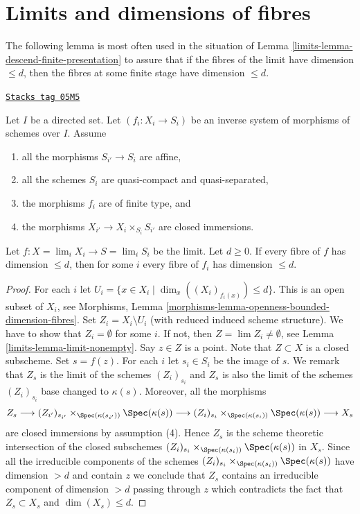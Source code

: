 \section{Limits and dimensions of fibres}
\label{limits-section-limits-dimension}
The following lemma is most often used in the situation of
Lemma \ref{limits-lemma-descend-finite-presentation}
to assure that if the fibres of the limit have dimension $\leq d$,
then the fibres at some finite stage have dimension $\leq d$.

\begin{lemma}
\label{limits-lemma-limit-dimension}
\href{https://stacks.math.columbia.edu/tag/05M5}{\texttt{Stacks tag 05M5}}

Let $I$ be a directed set.
Let $(f_i : X_i \to S_i)$ be an inverse system of morphisms of schemes
over $I$. Assume
\begin{enumerate}
\item all the morphisms $S_{i'} \to S_i$ are affine,
\item all the schemes $S_i$ are quasi-compact and quasi-separated,
\item the morphisms $f_i$ are of finite type, and
\item the morphisms $X_{i'} \to X_i \times_{S_i} S_{i'}$ are closed
immersions.
\end{enumerate}
Let $f : X = \lim_i X_i \to S = \lim_i S_i$ be the limit.
Let $d \geq 0$.
If every fibre of $f$ has dimension $\leq d$, then for some $i$
every fibre of $f_i$ has dimension $\leq d$.
\end{lemma}

\begin{proof}

For each $i$ let $U_i = \{x \in X_i \mid \dim_x((X_i)_{f_i(x)}) \leq d\}$.
This is an open subset of $X_i$, see
Morphisms, Lemma \ref{morphisms-lemma-openness-bounded-dimension-fibres}.
Set $Z_i = X_i \setminus U_i$ (with reduced induced scheme structure).
We have to show that $Z_i = \emptyset$ for some $i$.
If not, then $Z = \lim Z_i \not = \emptyset$, see
Lemma \ref{limits-lemma-limit-nonempty}.
Say $z \in Z$ is a point. Note that $Z \subset X$ is a closed subscheme.
Set $s = f(z)$. For each $i$ let $s_i \in S_i$ be the image
of $s$. We remark that $Z_s$ is the limit of the schemes $(Z_i)_{s_i}$
and $Z_s$ is also the limit of the schemes $(Z_i)_{s_i}$ base
changed to $\kappa(s)$. Moreover, all the morphisms
$$
Z_s
\longrightarrow
(Z_{i'})_{s_{i'}} \times_{\Spec(\kappa(s_{i'}))} \Spec(\kappa(s))
\longrightarrow
(Z_i)_{s_i} \times_{\Spec(\kappa(s_i))} \Spec(\kappa(s))
\longrightarrow
X_s
$$
are closed immersions by assumption (4). Hence $Z_s$ is the scheme
theoretic intersection of the closed subschemes
$(Z_i)_{s_i} \times_{\Spec(\kappa(s_i))} \Spec(\kappa(s))$
in $X_s$. Since all the irreducible components of the schemes
$(Z_i)_{s_i} \times_{\Spec(\kappa(s_i))} \Spec(\kappa(s))$
have dimension $> d$ and contain $z$ we conclude that
$Z_s$ contains an irreducible component of dimension $> d$ passing
through $z$ which contradicts the fact that $Z_s \subset X_s$ and
$\dim(X_s) \leq d$.
\end{proof}

